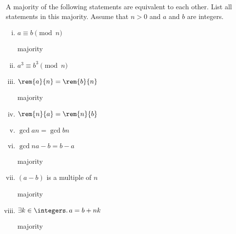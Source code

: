 
\begin{pcomments}
\end{pcomments}


\begin{problem}

A majority of the following statements are equivalent to each other.
List all statements in this majority.  Assume that $n > 0$ and $a$ and
$b$ are integers.  
      
\begin{enumerate}[i)]
       
\item
 $a \equiv  b \pmod n$
            
\begin{solution}
majority
\end{solution}

\item
 $a^3 \equiv  b^3 \pmod n$

\item
 $\rem{a}{n} = \rem{b}{n}$

\begin{solution}
majority
\end{solution}

\item
 $\rem{n}{a} = \rem{n}{b}$

\item
 $\gcd{a}{n} = \gcd{b}{n}$

\item
 $\gcd{n}{a-b} = b-a$

\begin{solution}
majority
\end{solution}

\item
 $(a - b)$ is a multiple of $n$

\begin{solution}
majority
\end{solution}

\item
 $\exists k \in \integers.\, a = b + nk$
       
\begin{solution}
majority
\end{solution}


\end{enumerate}

\end{problem}

\endinput
